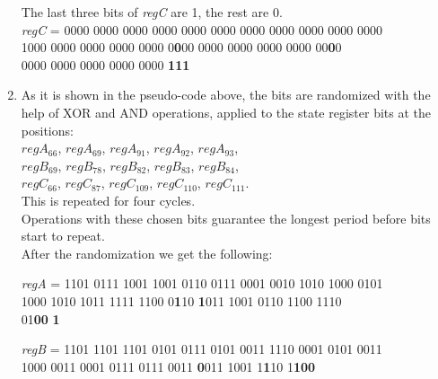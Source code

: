 \begin{enumerate}
	The last three bits of \emph{regC} are 1, the rest are 0.
	\vspace{0.5em}
	\\
	{\selectfont
		\emph{regC} = 0000 0000 0000 0000 0000 0000 0000 0000 0000 0000 0000 \\ 
		\indent\hspace{1.6cm}1000 0000 0000 0000 0000 0\textbf{0}00 0000 0000 0000 0000 00\textbf{0}0 \\ 
		\indent\hspace{1.6cm}0000 0000 0000 0000 0000 \textbf{111}
	}
	\item As it is shown in the pseudo-code above, the bits are randomized with the help of XOR and AND operations, applied to the state register bits at the positions: 
	\vspace{0.5em}
	\\
	$regA_{66}$, $regA_{69}$, $regA_{91}$, $regA_{92}$, $regA_{93}$, \\
	$regB_{69}$, $regB_{78}$, $regB_{82}$, $regB_{83}$, $regB_{84}$, \\
	$regC_{66}$, $regC_{87}$, $regC_{109}$, $regC_{110}$, $regC_{111}$.
	\vspace{0.5em}
	\\
	This is repeated for four cycles.\\
	Operations with these chosen bits guarantee the longest period before bits start to repeat.\\
	After the randomization we get the following:
	
	{\selectfont
		
		\emph{regA} = 1101 0111 1001 1001 0110 0111 0001 0010 1010 1000 0101 \\ 
		\indent\hspace{1.6cm}1000 1010 1011 1111 1100 0\textbf{1}10 \textbf{1}011 1001 0110 1100 1110 \\ 
		\indent\hspace{1.6cm}01\textbf{00} \textbf{1}
		
		\emph{regB} = 1101 1101 1101 0101 0111 0101 0011 1110 0001 0101 0011 \\ 
		\indent\hspace{1.6cm}1000 0011 0001 0111 0111 0011 \textbf{0}011 1001 1\textbf{1}10 1\textbf{100}
		
}
\end{enumerate}

